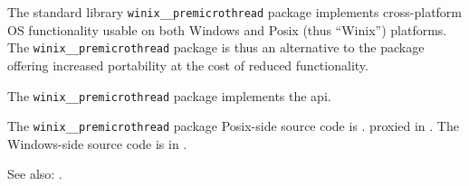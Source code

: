 
The standard library {\tt winix\_\_premicrothread} package implements cross-platform {\sc OS} functionality 
usable on both Windows and Posix (thus ``Winix'') platforms.  The {\tt winix\_\_premicrothread} package is thus an 
alternative to the  package offering increased portability at the 
cost of reduced functionality.

The {\tt winix\_\_premicrothread} package implements the  api.

The {\tt winix\_\_premicrothread} package Posix-side source code is . 
proxied in .  The Windows-side source code 
is in .

See also: .
